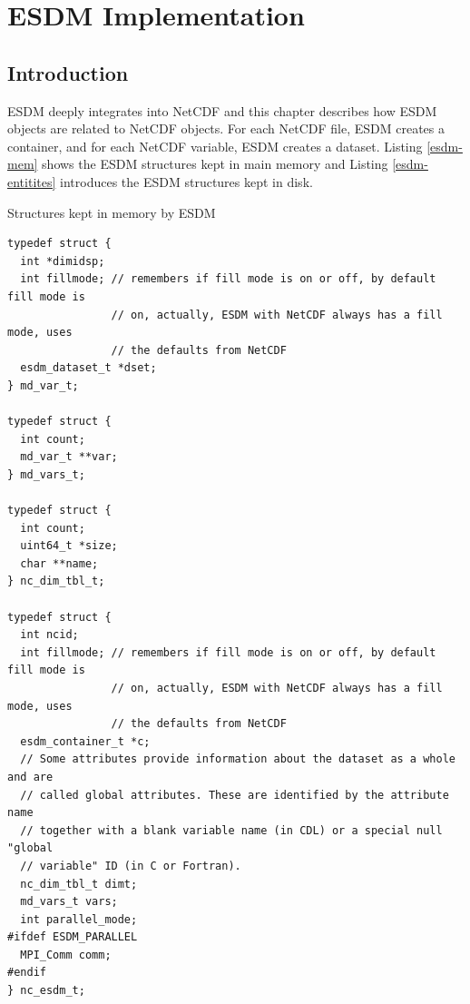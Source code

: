 \chapter{ESDM Implementation}
\label{ch:imp}

\section{Introduction}

ESDM deeply integrates into NetCDF and this chapter describes how ESDM objects are related to NetCDF objects.
For each NetCDF file, ESDM creates a container, and for each NetCDF variable, ESDM creates a dataset.
Listing \ref{esdm-mem} shows the ESDM structures kept in main memory and Listing \ref{esdm-entitites} introduces the ESDM structures kept in disk.

\begin{tcbcode}[label=esdm-mem]{Structures kept in memory by ESDM}
\begin{lstlisting}[upquote=true]
typedef struct {
  int *dimidsp;
  int fillmode; // remembers if fill mode is on or off, by default fill mode is
                // on, actually, ESDM with NetCDF always has a fill mode, uses
                // the defaults from NetCDF
  esdm_dataset_t *dset;
} md_var_t;

typedef struct {
  int count;
  md_var_t **var;
} md_vars_t;

typedef struct {
  int count;
  uint64_t *size;
  char **name;
} nc_dim_tbl_t;

typedef struct {
  int ncid;
  int fillmode; // remembers if fill mode is on or off, by default fill mode is
                // on, actually, ESDM with NetCDF always has a fill mode, uses
                // the defaults from NetCDF
  esdm_container_t *c;
  // Some attributes provide information about the dataset as a whole and are
  // called global attributes. These are identified by the attribute name
  // together with a blank variable name (in CDL) or a special null "global
  // variable" ID (in C or Fortran).
  nc_dim_tbl_t dimt;
  md_vars_t vars;
  int parallel_mode;
#ifdef ESDM_PARALLEL
  MPI_Comm comm;
#endif
} nc_esdm_t;
\end{lstlisting}
\end{tcbcode}

